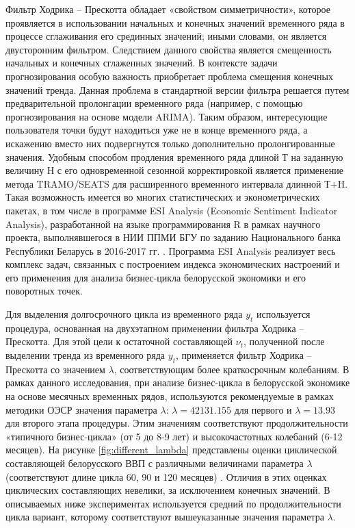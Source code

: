 \documentclass[a4paper,14pt]{extreport}
\begin{document}
	Фильтр Ходрика -- Прескотта обладает «свойством симметричности», которое проявляется в использовании начальных и конечных значений временного ряда в процессе сглаживания его срединных значений; иными словами, он является двусторонним фильтром. Следствием данного свойства является смещенность начальных и конечных сглаженных значений. В контексте задачи прогнозирования особую важность приобретает проблема смещения конечных значений тренда. Данная проблема в стандартной версии фильтра решается путем предварительной пролонгации временного ряда (например, с помощью прогнозирования на основе модели ARIMA). Таким образом, интересующие пользователя точки будут находиться уже не в конце временного ряда, а искажению вместо них подвергнутся только дополнительно пролонгированные значения.
	Удобным способом продления временного ряда длиной Т на заданную величину Н с его одновременной сезонной корректировкой является применение метода TRAMO/SEATS для расширенного временного интервала длинной Т+H. Такая возможность имеется во многих статистических и эконометрических пакетах, в том числе в программе ESI Analysis (Economic Sentiment Indicator Analysis), разработанной на языке программирования R в рамках научного проекта, выполнявшегося в НИИ ППМИ БГУ по заданию Национального банка Республики Беларусь в 2016-2017 гг. \cite{esiMaking}. Программа ESI Analysis реализует весь комплекс задач, связанных с построением индекса экономических настроений и его применения для анализа бизнес-цикла белорусской экономики и его поворотных точек.  
	
	Для выделения долгосрочного цикла из временного ряда $y_t$ используется процедура, основанная на двухэтапном применении фильтра Ходрика -- Прескотта. Для этой цели к остаточной составляющей $\nu_t$, полученной после выделении тренда из временного ряда $y_t$, применяется фильтр Ходрика -- Прескотта со значением $\lambda$, соответствующим более краткосрочным колебаниям. В рамках данного исследования, при анализе бизнес-цикла в белорусской экономике на основе месячных временных рядов,  используются рекомендуемые в рамках методики ОЭСР значения параметра $\lambda$:  $\lambda = 42131.155$ для первого и $\lambda = 13.93$ для второго этапа процедуры. Этим значениям соответствуют продолжительности «типичного бизнес-цикла» (от 5 до 8-9 лет) и высокочастотных колебаний (6-12 месяцев). На рисунке \ref{fig:different_lambda} представлены оценки циклической составляющей белорусского ВВП с различными величинами параметра $\lambda$ (соответствуют длине цикла 60, 90 и 120 месяцев) \cite{esiMakingAlt}. Отличия в этих оценках циклических составляющих невелики, за исключением конечных значений.  В описываемых ниже экспериментах используется средний по продолжительности цикла вариант, которому соответствуют вышеуказанные значения параметра $\lambda$.
	
\end{document}
